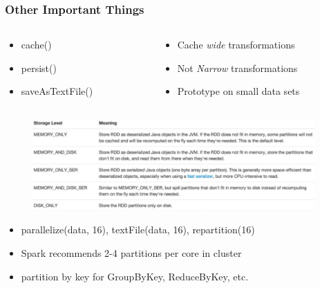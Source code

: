 \documentclass[xcolor={dvipsnames}]{beamer}
\begin{document}
\frame
{
\frametitle{Other Important Things}


\begin{columns}
\begin{column}{.33\textwidth}

\begin{itemize}
\item cache()
\item persist()
\item saveAsTextFile()
\end{itemize}

\end{column}
\begin{column}{.67\textwidth}

\begin{itemize}
\item Cache \emph{wide} transformations
\item Not \emph{Narrow} transformations
\item Prototype on small data sets
\end{itemize}
\end{column}
\end{columns}

\begin{figure}
\includegraphics[width=4.25in]{stuff/storage.jpg}
\end{figure}
\begin{itemize}
\item parallelize(data, 16), textFile(data, 16), repartition(16)
\item Spark recommends 2-4 partitions per core in cluster
\item partition by key for GroupByKey, ReduceByKey, etc.
\end{itemize}

}
\end{document}
